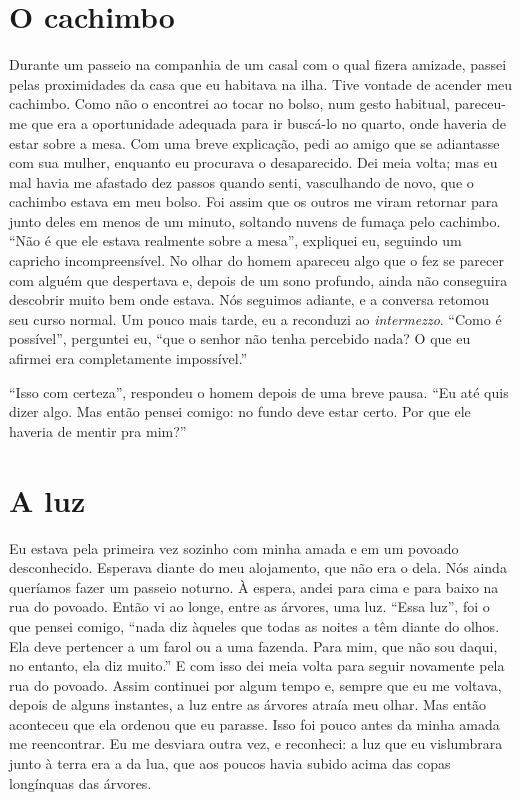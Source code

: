 \section{O cachimbo}

Durante um passeio na companhia de um casal com o qual fizera amizade,
passei pelas proximidades da casa que eu habitava na ilha. Tive vontade
de acender meu cachimbo. Como não o encontrei ao tocar no bolso, num
gesto habitual, pareceu-me que era a oportunidade adequada para ir
buscá-lo no quarto, onde haveria de estar sobre a mesa. Com uma breve
explicação, pedi ao amigo que se adiantasse com sua mulher, enquanto eu
procurava o desaparecido. Dei meia volta; mas eu mal havia me afastado
dez passos quando senti, vasculhando de novo, que o cachimbo estava em
meu bolso. Foi assim que os outros me viram retornar para junto deles em
menos de um minuto, soltando nuvens de fumaça pelo cachimbo. ``Não é que
ele estava realmente sobre a mesa'', expliquei eu, seguindo um capricho
incompreensível. No olhar do homem apareceu algo que o fez se parecer
com alguém que despertava e, depois de um sono profundo, ainda não
conseguira descobrir muito bem onde estava. Nós seguimos adiante, e a
conversa retomou seu curso normal. Um pouco mais tarde, eu a reconduzi
ao \emph{intermezzo}. ``Como é possível'', perguntei eu, ``que o senhor não
tenha percebido nada? O que eu afirmei era completamente impossível.''

``Isso com certeza'', respondeu o homem depois de uma breve pausa. ``Eu até
quis dizer algo. Mas então pensei comigo: no fundo deve estar certo. Por
que ele haveria de mentir pra mim?''

\section{A luz }

Eu estava pela primeira vez sozinho com minha amada e em um povoado
desconhecido. Esperava diante do meu alojamento, que não era o dela. Nós
ainda queríamos fazer um passeio noturno. À espera, andei para cima e
para baixo na rua do povoado. Então vi ao longe, entre as árvores, uma
luz. ``Essa luz'', foi o que pensei comigo, ``nada diz àqueles que todas
as noites a têm diante do olhos. Ela deve pertencer a um farol ou a uma
fazenda. Para mim, que não sou daqui, no entanto, ela diz muito.'' E com
isso dei meia volta para seguir novamente pela rua do povoado. Assim
continuei por algum tempo e, sempre que eu me voltava, depois de alguns
instantes, a luz entre as árvores atraía meu olhar. Mas então aconteceu
que ela ordenou que eu parasse. Isso foi pouco antes da minha amada me
reencontrar. Eu me desviara outra vez, e reconheci: a luz que eu
vislumbrara junto à terra era a da lua, que aos poucos havia subido
acima das copas longínquas das árvores.

